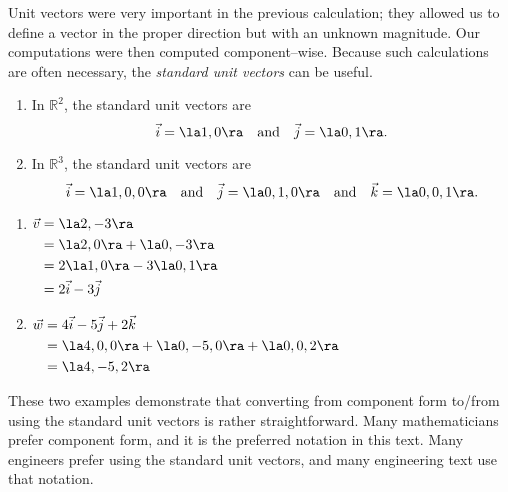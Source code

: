 Unit vectors were very important in the previous calculation; they allowed us to define a vector in the proper direction but with an unknown magnitude. Our computations were then computed component--wise. Because such calculations are often necessary, the \textit{standard unit vectors} can be useful.

{\begin{enumerate}
	\item In $\mathbb{R}^2$, the standard unit vectors are
	$$\vec i = \la 1,0\ra \quad \text{and}\quad \vec j = \la 0,1\ra.$$
	\item In $\mathbb{R}^3$, the standard unit vectors are
	$$\vec i = \la 1,0,0\ra \quad \text{and}\quad \vec j = \la 0,1,0\ra \quad \text{and}\quad \vec k = \la 0,0,1\ra.$$
\end{enumerate}
}

{\begin{enumerate}
	\item  \hfill$\displaystyle \begin{aligned}[t]
					\vec v &= \la 2,-3\ra \\
								&= \la 2,0\ra + \la 0,-3\ra \\
								&= 2\la 1,0\ra -3\la 0,1\ra\\
								&= 2\vec i - 3\vec j
				\end{aligned}$\hfill\null
	
	\item	\hfill $\displaystyle \begin{aligned}[t]
				\vec w &= 4\vec i - 5\vec j +2\vec k\\
							&= \la 4,0,0\ra +\la 0,-5,0\ra + \la 0,0,2\ra \\
							&= \la 4,-5,2\ra
							\end{aligned}$\hfill\null
\end{enumerate}
These two examples demonstrate that converting from component form to/from using the standard unit vectors is rather straightforward. Many mathematicians prefer component form, and it is the preferred notation in this text. Many engineers prefer using the standard unit vectors, and many engineering text use that notation.
}\\

